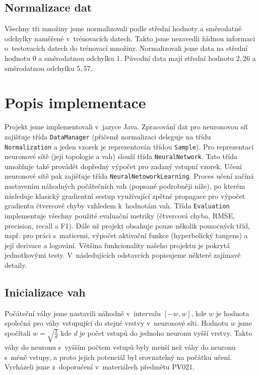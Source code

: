 \documentclass[a4paper, 10pt, twocolumn]{article}
\begin{document}
    \subsection{Normalizace dat}
        Všechny tři množiny jsme normalizovali podle střední hodnoty a směrodatné odchylky naměřené v~trénovacích datech. Takto jsme nezavedli žádnou informaci o~testovacích datech do trénovací množiny. Normalizovali jsme data na střední hodnotu 0 a směrodatnou odchylku 1. Původní data mají střední hodnotu $2,26$ a směrodatnou odchylku $5,57$.
\section{Popis implementace}
    Projekt jsme implementovali v~jazyce Java.
    Zpracování dat pro neuronovou síť zajišťuje třída \texttt{DataManager} (přičemž normalizaci deleguje na třídu \texttt{Normalization} a jeden vzorek je reprezentován třídou \texttt{Sample}).
    Pro reprezentaci neuronové sítě (její topologie a vah) slouží třída \texttt{NeuralNetwork}. Tato třída umožňuje také provádět dopředný výpočet pro zadaný vstupní vzorek.
    Učení neuronové sítě pak zajišťuje třída \texttt{NeuralNetoworkLearning}. Proces učení začíná nastavením náhodných počátečních vah (popsané podrobněji níže), po kterém následuje klasický gradientní sestup využívající zpětné propagace pro výpočet gradientu čtvercové chyby vzhledem k~hodnotám vah.
    Třída \texttt{Evaluation} implementuje všechny použité evaluační metriky (čtvercová chyba, RMSE, precision, recall a F1).
    Dále už projekt obsahuje pouze několik pomocných tříd, např. pro práci s~maticemi, výpočet aktivační funkce (hyperbolický tangens) a její derivace a logování.
    Většina funkcionality našeho projektu je pokrytá jednotkovými testy.
    V~následujících odstavcích popisujeme některé zajímavé detaily.

    \subsection{Inicializace vah}
      Počáteční váhy jsme nastavili náhodně v~intervalu $[-w,w]$, kde $w$ je hodnota společná pro váhy vstupující do stejné vrstvy v~neuronové síti. Hodnotu $w$ jsme spočítali $w = \sqrt{\frac{3}{d}}$ kde $d$ je počet vstupů do jednoho neuronu vyšší vrstvy. Takto váhy do neuronu s~vyšším počtem vstupů byly menší než váhy do neuronu s~méně vstupy, a proto jejich potenciál byl srovnatelný na počátku učení. Vycházeli jsme z~doporučení v~materiálech předmětu PV021.
\end{document}
